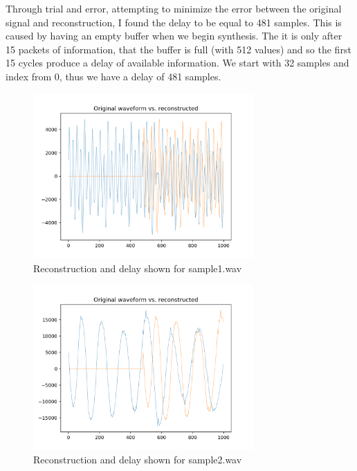 \documentclass[11pt,a4paper]{article}
\begin{document}
Through trial and error, attempting to minimize the error between the original signal and reconstruction, I found the delay to be equal to 481 samples. This is caused by having an empty buffer when we begin synthesis. The it is only after 15 packets of information, that the buffer is full (with 512 values) and so the first 15 cycles produce a delay of available information. We start with 32 samples and index from 0, thus we have a delay of 481 samples.

\begin{figure}[ht]
	\centering
	\includegraphics[width=0.75\textwidth]{synthesis/sample1_delay}
	\caption{Reconstruction and delay shown for sample1.wav}
	\label{fig:synthesis_sample1}
\end{figure}

\begin{figure}[ht]
	\centering
	\includegraphics[width=0.75\textwidth]{synthesis/sample2_delay}
	\caption{Reconstruction and delay shown for sample2.wav}
	\label{fig:synthesis_sample2}
\end{figure}

\pagebreak
\end{document}
